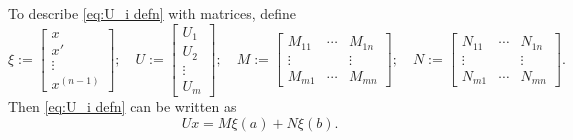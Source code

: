 \documentclass[11pt, oneside, a4paper]{article}
\begin{document}
\begin{rmk}\label{rmk:writing Ux in M, N (M:N)}
    To describe \eqref{eq:U_i defn} with matrices, define
    \[
        \xi:= \begin{bmatrix}x\\ x'\\ \vdots \\ x^{(n-1)}
        \end{bmatrix};
            \quad
        U := \begin{bmatrix}U_1\\ U_2\\ \vdots \\ U_m
        \end{bmatrix};
            \quad
        M := \begin{bmatrix}
            M_{11} & \cdots & M_{1n}\\
            \vdots &  & \vdots\\
            M_{m1} & \cdots & M_{mn}
        \end{bmatrix};
        \quad
        N := \begin{bmatrix}
            N_{11} & \cdots & N_{1n}\\
            \vdots &  & \vdots\\
            N_{m1} & \cdots & N_{mn}
        \end{bmatrix}.
    \]
    Then \eqref{eq:U_i defn} can be written as
    \[Ux = M\xi(a) + N\xi(b).\]
\end{rmk}
\end{document}
